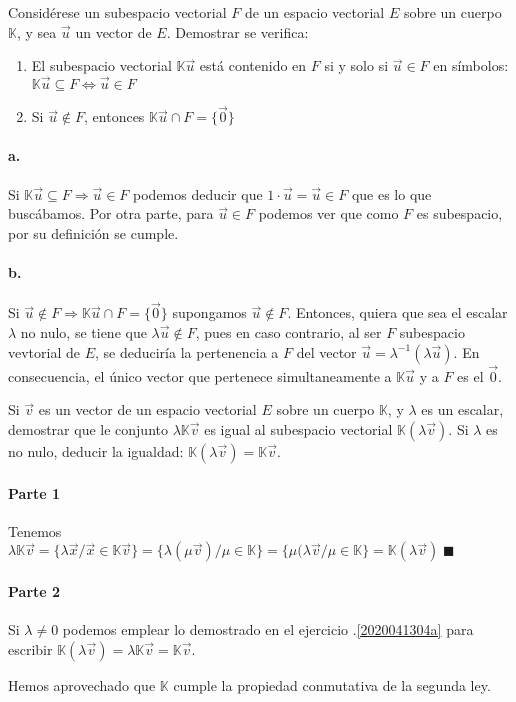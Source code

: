 \begin{problema}{\cite[92p141]{prieto2000}}{\label{20200414b}
	Considérese un subespacio vectorial $F$ de un espacio vectorial $E$ sobre un cuerpo
	$\mathbb{K}$, y sea $\vec{u}$ un vector de $E$. Demostrar se verifica:
	\begin{enumerate}
		\item El subespacio vectorial $\mathbb{K}\vec{u}$ está contenido en $F$ si y solo si
			$\vec{u}\in F$ en símbolos: $\mathbb{K}\vec{u}\subseteq F \iff \vec{u}\in F$
		\item Si $\vec{u}\not\in F$, entonces $\mathbb{K}\vec{u} \cap F = \{\vec{0}\}$
	\end{enumerate}
	}
	\paragraph{a.} Si $\mathbb{K}\vec{u}\subseteq F \Rightarrow \vec{u}\in F$ podemos deducir que
	$1\cdot\vec{u}=\vec{u}\in F$ que es lo que buscábamos. Por otra parte, para $\vec{u}\in F$
	podemos ver que como $F$ es subespacio, por su definición se cumple.

	\paragraph{b.} Si $\vec{u}\not\in F \Rightarrow \mathbb{K}\vec{u}\cap F=\{\vec{0}\}$ supongamos
	$\vec{u}\not\in F$. Entonces, quiera que sea el escalar $\lambda$ no nulo, se tiene que
	$\lambda\vec{u}\not\in F$, pues en caso contrario, al ser $F$ subespacio vevtorial de $E$, se
	deduciría la pertenencia a $F$ del vector $\vec{u}=\lambda^{-1}(\lambda\vec{u})$. En consecuencia, el
	único vector que pertenece simultaneamente a $\mathbb{K}\vec{u}$ y a $F$ es el $\vec{0}$.
\end{problema}
\begin{problema}{\cite[88p139]{prieto2000}}{\label{20200414a}
	Si $\vec{v}$ es un vector de un espacio vectorial $E$ sobre un cuerpo $\mathbb{K}$, y $\lambda$ es
	un escalar, demostrar que le conjunto $\lambda\mathbb{K}\vec{v}$ es igual al subespacio
	vectorial $\mathbb{K}(\lambda\vec{v})$. Si $\lambda$ es no nulo, deducir la igualdad:
	$\mathbb{K}(\lambda\vec{v})=\mathbb{K}\vec{v}$.
	}
	\paragraph{Parte 1} Tenemos 
	$\lambda\mathbb{K}\vec{v}=\{\lambda\vec{x}/\vec{x}\in\mathbb{K}\vec{v}\}
		=\{\lambda(\mu\vec{v})/\mu\in\mathbb{K}\}=\{\mu(\lambda\vec{v}/\mu\in\mathbb{K}\}
		=\mathbb{K}(\lambda\vec{v}) \; \blacksquare$
	
	\paragraph{Parte 2} Si $\lambda\neq0$ podemos emplear lo demostrado en el ejercicio
	\thesection.\ref{2020041304a} para escribir
	$\mathbb{K}(\lambda\vec{v})=\lambda\mathbb{K}\vec{v}=\mathbb{K}\vec{v}$.

	Hemos aprovechado que $\mathbb{K}$ cumple la propiedad conmutativa de la segunda ley.
\end{problema}
